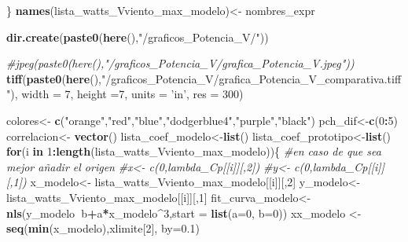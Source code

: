 \documentclass[]{article}
\newenvironment{Shaded}{\begin{snugshade}}{\end{snugshade}}
\newcommand{\KeywordTok}[1]{\textcolor[rgb]{0.13,0.29,0.53}{\textbf{#1}}}
\newcommand{\DataTypeTok}[1]{\textcolor[rgb]{0.13,0.29,0.53}{#1}}
\newcommand{\DecValTok}[1]{\textcolor[rgb]{0.00,0.00,0.81}{#1}}
\newcommand{\FloatTok}[1]{\textcolor[rgb]{0.00,0.00,0.81}{#1}}
\newcommand{\StringTok}[1]{\textcolor[rgb]{0.31,0.60,0.02}{#1}}
\newcommand{\CommentTok}[1]{\textcolor[rgb]{0.56,0.35,0.01}{\textit{#1}}}
\newcommand{\ControlFlowTok}[1]{\textcolor[rgb]{0.13,0.29,0.53}{\textbf{#1}}}
\newcommand{\OperatorTok}[1]{\textcolor[rgb]{0.81,0.36,0.00}{\textbf{#1}}}
\newcommand{\NormalTok}[1]{#1}
\begin{document}
\begin{Shaded}
\begin{Highlighting}[]
{{{{{{{{    
\NormalTok{  \}}
  \KeywordTok{names}\NormalTok{(lista_watts_Vviento_max_modelo)<-}\StringTok{ }\NormalTok{nombres_expr}
  
  \KeywordTok{dir.create}\NormalTok{(}\KeywordTok{paste0}\NormalTok{(}\KeywordTok{here}\NormalTok{(),}\StringTok{"/graficos_Potencia_V/"}\NormalTok{))}
  
  \CommentTok{#jpeg(paste0(here(),"/graficos_Potencia_V/grafica_Potencia_V.jpeg"))}
  \KeywordTok{tiff}\NormalTok{(}\KeywordTok{paste0}\NormalTok{(}\KeywordTok{here}\NormalTok{(),}\StringTok{"/graficos_Potencia_V/grafica_Potencia_V_comparativa.tiff"}\NormalTok{), }\DataTypeTok{width =} \DecValTok{7}\NormalTok{, }\DataTypeTok{height =}\DecValTok{7}\NormalTok{, }\DataTypeTok{units =} \StringTok{'in'}\NormalTok{, }\DataTypeTok{res =} \DecValTok{300}\NormalTok{)}
  
  
\NormalTok{  colores<-}\StringTok{ }\KeywordTok{c}\NormalTok{(}\StringTok{"orange"}\NormalTok{,}\StringTok{"red"}\NormalTok{,}\StringTok{"blue"}\NormalTok{,}\StringTok{"dodgerblue4"}\NormalTok{,}\StringTok{"purple"}\NormalTok{,}\StringTok{"black"}\NormalTok{)}
\NormalTok{  pch_dif<-}\KeywordTok{c}\NormalTok{(}\DecValTok{0}\OperatorTok{:}\DecValTok{5}\NormalTok{)}
\NormalTok{  correlacion<-}\StringTok{ }\KeywordTok{vector}\NormalTok{()}
\NormalTok{  lista_coef_modelo<-}\KeywordTok{list}\NormalTok{()}
\NormalTok{  lista_coef_prototipo<-}\KeywordTok{list}\NormalTok{()}
  \ControlFlowTok{for}\NormalTok{(i }\ControlFlowTok{in} \DecValTok{1}\OperatorTok{:}\KeywordTok{length}\NormalTok{(lista_watts_Vviento_max_modelo))\{}
    \CommentTok{#en caso de que sea mejor añadir el origen}
    \CommentTok{#x<- c(0,lambda_Cp[[i]][,2])}
    \CommentTok{#y<- c(0,lambda_Cp[[i]][,1])}
\NormalTok{    x_modelo<-}\StringTok{ }\NormalTok{lista_watts_Vviento_max_modelo[[i]][,}\DecValTok{2}\NormalTok{]}
\NormalTok{    y_modelo<-}\StringTok{ }\NormalTok{lista_watts_Vviento_max_modelo[[i]][,}\DecValTok{1}\NormalTok{]}
\NormalTok{    fit_curva_modelo<-}\KeywordTok{nls}\NormalTok{(y_modelo}\OperatorTok{~}\NormalTok{b}\OperatorTok{+}\NormalTok{a}\OperatorTok{*}\NormalTok{x_modelo}\OperatorTok{^}\DecValTok{3}\NormalTok{,}\DataTypeTok{start =} \KeywordTok{list}\NormalTok{(}\DataTypeTok{a=}\DecValTok{0}\NormalTok{, }\DataTypeTok{b=}\DecValTok{0}\NormalTok{))}
\NormalTok{    xx_modelo <-}\StringTok{ }\KeywordTok{seq}\NormalTok{(}\KeywordTok{min}\NormalTok{(x_modelo),xlimite[}\DecValTok{2}\NormalTok{], }\DataTypeTok{by=}\FloatTok{0.1}\NormalTok{)}
    
}}}}}}}}
\end{Highlighting}
\end{Shaded}
\end{document}
